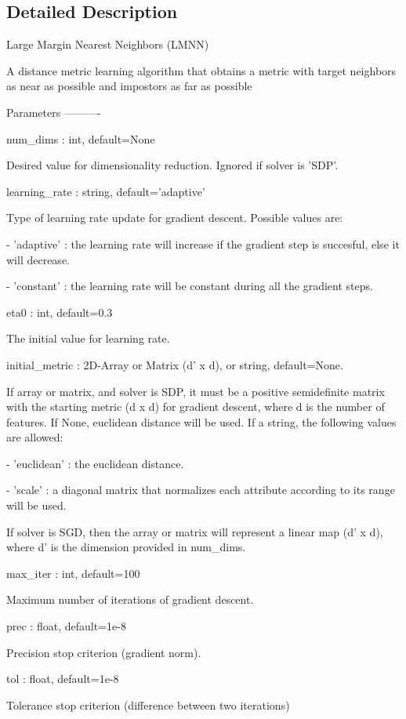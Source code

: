 \subsection{Detailed Description}
\begin{DoxyVerb}Large Margin Nearest Neighbors (LMNN)

A distance metric learning algorithm that obtains a metric with target neighbors as near as possible and impostors as far as possible

Parameters
----------

num_dims : int, default=None

    Desired value for dimensionality reduction. Ignored if solver is 'SDP'.

learning_rate : string, default='adaptive'

    Type of learning rate update for gradient descent. Possible values are:

    - 'adaptive' : the learning rate will increase if the gradient step is succesful, else it will decrease.

    - 'constant' : the learning rate will be constant during all the gradient steps.

eta0 : int, default=0.3

    The initial value for learning rate.

initial_metric : 2D-Array or Matrix (d' x d), or string, default=None.

    If array or matrix, and solver is SDP, it must be a positive semidefinite matrix with the starting metric (d x d) for gradient descent, where d is the number of features.
    If None, euclidean distance will be used. If a string, the following values are allowed:

    - 'euclidean' : the euclidean distance.

    - 'scale' : a diagonal matrix that normalizes each attribute according to its range will be used.

    If solver is SGD, then the array or matrix will represent a linear map (d' x d), where d' is the dimension provided in num_dims.

max_iter : int, default=100

    Maximum number of iterations of gradient descent.

prec : float, default=1e-8

    Precision stop criterion (gradient norm).

tol : float, default=1e-8

    Tolerance stop criterion (difference between two iterations)


\end{DoxyVerb}
